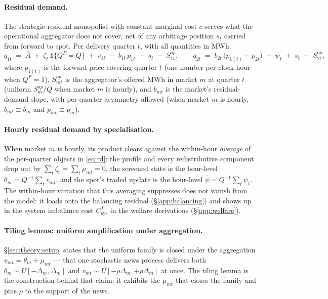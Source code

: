 \documentclass[11pt,a4paper]{article}
\theoremstyle{definition}
\theoremstyle{remark}
\theoremstyle{plain}
\begin{document}
\paragraph{Residual demand.} The strategic residual monopolist with constant marginal cost $c$ serves what the operational aggregator does not cover, net of any arbitrage position $s_t$ carried from forward to spot. Per delivery quarter $t$, with all quantities in MWh:
\begin{equation}
q_{1t} \;=\; \bar A \;+\; \zeta_t\,\mathds{1}\{Q^F = Q\} \;+\; v_{1t} \;-\; b_{1t}\, p_{1t} \;-\; s_t \;-\; S^{op}_{1t},
\qquad
q_{2t} \;=\; b_{2t}\,\bigl(p_{1(t)} - p_{2t}\bigr) \;+\; \psi_t \;+\; s_t \;-\; S^{op}_{2t},
\label{eq:rd}
\end{equation}
where $p_{1(t)}$ is the forward price covering quarter $t$ (one number per clock-hour when $Q^F = 1$), $S^{op}_{mt}$ is the aggregator's offered MWh in market $m$ at quarter $t$ (uniform $S^{op}_m / Q$ when market $m$ is hourly), and $b_{mt}$ is the market's residual-demand slope, with per-quarter asymmetry allowed (when market $m$ is hourly, $b_{mt} \equiv b_m$ and $p_{mt} \equiv p_m$).

\paragraph{Hourly residual demand by specialisation.} When market $m$ is hourly, its product clears against the within-hour \emph{average} of the per-quarter objects in \eqref{eq:rd}: the profile and every redistributive component drop out by $\sum_t \zeta_t = \sum_t \mu_{mt} = 0$, the screened state is the hour-level $\theta_m = Q^{-1}\sum_t v_{mt}$, and the spot's traded update is the hour-level $\bar\psi = Q^{-1}\sum_t \psi_t$. The within-hour variation that this averaging suppresses does not vanish from the model: it loads onto the balancing residual (\S\ref{app:balancing}) and shows up in the system imbalance cost $C^I_{\text{sys}}$ in the welfare derivations (\S\ref{app:welfare}).

\paragraph{Tiling lemma: uniform amplification under aggregation.} \S\ref{sec:theory:setup} states that the uniform family is closed under the aggregation $v_{mt} = \theta_m + \mu_{mt}$ --- that one stochastic news process delivers both $\theta_m \sim U[-\Delta_m, \Delta_m]$ and $v_{mt} \sim U[-\rho\Delta_m, +\rho\Delta_m]$ at once. The tiling lemma is the construction behind that claim: it exhibits the $\mu_{mt}$ that closes the family and pins $\rho$ to the support of the news.
\end{document}
